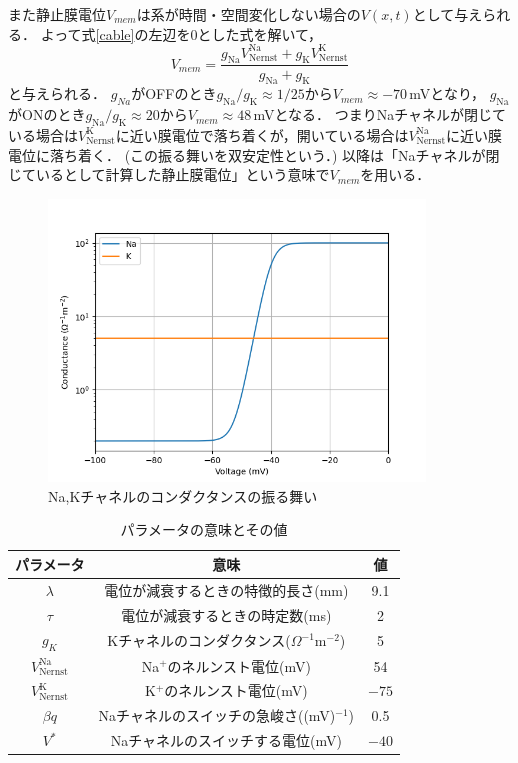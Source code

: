 \documentclass[a4paper,11pt]{jsarticle}
\begin{document}
また静止膜電位$V_{mem}$は系が時間・空間変化しない場合の$V(x,t)$として与えられる．
よって式\eqref{cable}の左辺を0とした式を解いて，
\begin{equation}
  V_{mem} = \frac{g_{\mathrm{Na}}V^{\mathrm{Na}}_{\mathrm{Nernst}} + g_{\mathrm{K}}V^{\mathrm{K}}_{\mathrm{Nernst}}}{g_{\mathrm{Na}}+g_{\mathrm{K}}} 
\end{equation}
と与えられる．
$g_{Na}$がOFFのとき$g_{\mathrm{Na}}/g_{\mathrm{K}}\approx 1/25$から$V_{mem}\approx -70$\,mVとなり，
$g_{\mathrm{Na}}$がONのとき$g_{\mathrm{Na}}/g_{\mathrm{K}}\approx 20$から$V_{mem}\approx 48$\,mVとなる．
つまりNaチャネルが閉じている場合は$V^{\mathrm{K}}_{\mathrm{Nernst}}$に近い膜電位で落ち着くが，開いている場合は$V^{\mathrm{Na}}_{\mathrm{Nernst}}$に近い膜電位に落ち着く．
(この振る舞いを双安定性という．)
以降は「Naチャネルが閉じているとして計算した静止膜電位」という意味で$V_{mem}$を用いる．

\begin{figure}[htbp]
  \centering
  \includegraphics[width=10cm]{gNa.png}
  \caption{Na,Kチャネルのコンダクタンスの振る舞い}
  \label{fig:gNa}
\end{figure}

\begin{table}[htbp]
  \centering
  \caption{パラメータの意味とその値}
  \label{tab:params}
  \begin{tabular}{c|c|c}
    \hline
    パラメータ & 意味 & 値 \\
    \hline
    $\lambda$ & 電位が減衰するときの特徴的長さ(mm) &9.1\\
    $\tau$ & 電位が減衰するときの時定数(ms) &2\\
    $g_{K}$ & Kチャネルのコンダクタンス($\Omega^{-1}$m$^{-2}$) &5\\
    $V^{\mathrm{Na}}_{\mathrm{Nernst}}$ & Na$^{+}$のネルンスト電位(mV) &54\\
    $V^{\mathrm{K}}_{\mathrm{Nernst}}$ & K$^{+}$のネルンスト電位(mV) &$-75$\\
    $\beta q$ & Naチャネルのスイッチの急峻さ((mV)$^{-1}$) &0.5\\
    $V^{\ast}$ & Naチャネルのスイッチする電位(mV) &$-40$\\
    \hline
  \end{tabular}
\end{table}
\end{document}
